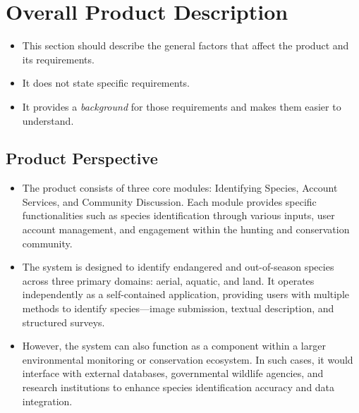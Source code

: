 \documentclass[]{article}
\begin{document}

\section{Overall Product Description}
\label{sec:overall_description}

\begin{itemize}
	\item This section should describe the general factors that affect the product and its requirements. 
	\item It does not state specific requirements.
	\item It provides a \emph{background} for those requirements and makes them easier to understand.
\end{itemize}


\subsection{Product Perspective}
\label{sub:product_perspective}
\begin{itemize}

	\item The product consists of three core modules: Identifying Species, Account Services, and Community Discussion. Each module provides specific functionalities such as species identification through various inputs, user account management, and engagement within the hunting and conservation community.

	\item The system is designed to identify endangered and out-of-season species across three primary domains: aerial, aquatic, and land. It operates independently as a self-contained application, providing users with multiple methods to identify species—image submission, textual description, and structured surveys.

	\item However, the system can also function as a component within a larger environmental monitoring or conservation ecosystem. In such cases, it would interface with external databases, governmental wildlife agencies, and research institutions to enhance species identification accuracy and data integration.

\end{itemize}
\end{document}
